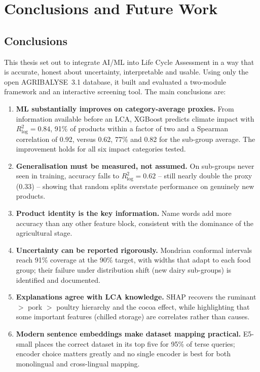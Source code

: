 \chapter{Conclusions and Future Work}
\label{ch:conclusion}

\section{Conclusions}

This thesis set out to integrate AI/ML into Life Cycle Assessment in a way that is accurate,
honest about uncertainty, interpretable and usable. Using only the open AGRIBALYSE~3.1 database, it
built and evaluated a two-module framework and an interactive screening tool. The main conclusions
are:

\begin{enumerate}
  \item \textbf{ML substantially improves on category-average proxies.} From information available
  before an LCA, XGBoost predicts climate impact with $R^2_{\log}=0.84$, 91\% of products within a
  factor of two and a Spearman correlation of 0.92, versus 0.62, 77\% and 0.82 for the sub-group
  average. The improvement holds for all six impact categories tested.
  \item \textbf{Generalisation must be measured, not assumed.} On sub-groups never seen in training,
  accuracy falls to $R^2_{\log}=0.62$ -- still nearly double the proxy (0.33) -- showing that random
  splits overstate performance on genuinely new products.
  \item \textbf{Product identity is the key information.} Name words add more accuracy than any other
  feature block, consistent with the dominance of the agricultural stage.
  \item \textbf{Uncertainty can be reported rigorously.} Mondrian conformal intervals reach 91\%
  coverage at the 90\% target, with widths that adapt to each food group; their failure under
  distribution shift (new dairy sub-groups) is identified and documented.
  \item \textbf{Explanations agree with LCA knowledge.} SHAP recovers the ruminant $>$ pork $>$ poultry
  hierarchy and the cocoa effect, while highlighting that some important features (chilled storage)
  are correlates rather than causes.
  \item \textbf{Modern sentence embeddings make dataset mapping practical.} E5-small places the
  correct dataset in its top five for 95\% of terse queries; encoder choice matters greatly and no
  single encoder is best for both monolingual and cross-lingual mapping.
\end{enumerate}

